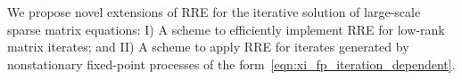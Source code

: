 We propose novel extensions of \ac{RRE} for the iterative solution of large-scale sparse matrix equations: I) A scheme to efficiently implement \ac{RRE} for low-rank matrix iterates; and II) A scheme to apply \ac{RRE} for iterates generated by nonstationary fixed-point processes of the form~\eqref{eqn:xi_fp_iteration_dependent}.  %
